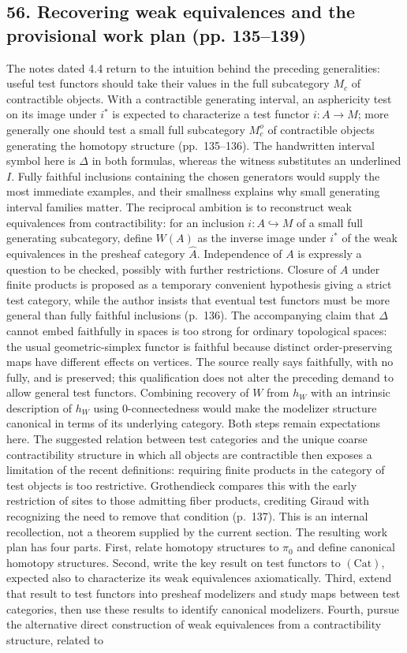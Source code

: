\subsection*{56. Recovering weak equivalences and the provisional work plan (pp. 135--139)}
The notes dated 4.4 return to the intuition behind the preceding generalities: useful test functors should take their values in the full subcategory $M_c$ of contractible objects. With a contractible generating interval, an asphericity test on its image under $i^*$ is expected to characterize a test functor $i:A\to M$; more generally one should test a small full subcategory $M_c^o$ of contractible objects generating the homotopy structure (pp.~135--136). The handwritten interval symbol here is $\Delta$ in both formulas, whereas the witness substitutes an underlined $I$. Fully faithful inclusions containing the chosen generators would supply the most immediate examples, and their smallness explains why small generating interval families matter. The reciprocal ambition is to reconstruct weak equivalences from contractibility: for an inclusion $i:A\hookrightarrow M$ of a small full generating subcategory, define $W(A)$ as the inverse image under $i^*$ of the weak equivalences in the presheaf category $\widehat A$. Independence of $A$ is expressly a question to be checked, possibly with further restrictions. Closure of $A$ under finite products is proposed as a temporary convenient hypothesis giving a strict test category, while the author insists that eventual test functors must be more general than fully faithful inclusions (p.~136). The accompanying claim that $\Delta$ cannot embed faithfully in spaces is too strong for ordinary topological spaces: the usual geometric-simplex functor is faithful because distinct order-preserving maps have different effects on vertices. The source really says faithfully, with no fully, and is preserved; this qualification does not alter the preceding demand to allow general test functors. Combining recovery of $W$ from $h_W$ with an intrinsic description of $h_W$ using $0$-connectedness would make the modelizer structure canonical in terms of its underlying category. Both steps remain expectations here. The suggested relation between test categories and the unique coarse contractibility structure in which all objects are contractible then exposes a limitation of the recent definitions: requiring finite products in the category of test objects is too restrictive. Grothendieck compares this with the early restriction of sites to those admitting fiber products, crediting Giraud with recognizing the need to remove that condition (p.~137). This is an internal recollection, not a theorem supplied by the current section. The resulting work plan has four parts. First, relate homotopy structures to $\pi_0$ and define canonical homotopy structures. Second, write the key result on test functors to $(\mathrm{Cat})$, expected also to characterize its weak equivalences axiomatically. Third, extend that result to test functors into presheaf modelizers and study maps between test categories, then use these results to identify canonical modelizers. Fourth, pursue the alternative direct construction of weak equivalences from a contractibility structure, related to 